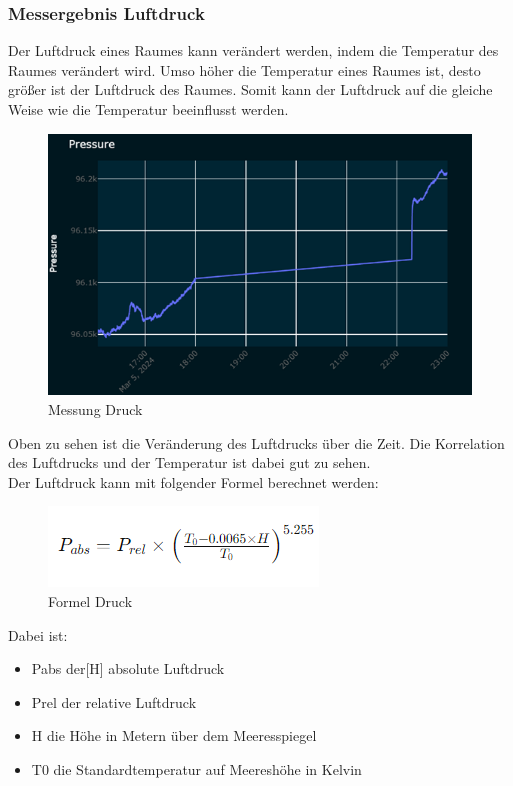 \subsubsection{Messergebnis Luftdruck}
Der Luftdruck eines Raumes kann verändert werden, indem die Temperatur des Raumes verändert wird. Umso höher die Temperatur eines Raumes ist, desto größer ist der Luftdruck des Raumes. Somit kann der Luftdruck auf die gleiche Weise wie die Temperatur beeinflusst werden.
\vspace{3mm}
\begin{figure}[H]
	\centering
	\includegraphics[scale=1]{image/druck.png}
	\caption{Messung Druck}
	\label{fig:enter-label}
\end{figure}
\vspace{3mm}
Oben zu sehen ist die Veränderung des Luftdrucks über die Zeit. Die Korrelation des Luftdrucks und der Temperatur ist dabei gut zu sehen. \\
\vspace{3mm}
Der Luftdruck kann mit folgender Formel berechnet werden: \\
\vspace{3mm}
\begin{figure}[H]
	\centering
	\includegraphics[scale=1.1]{image/formel.png}
	\caption{Formel Druck}
	\label{fig:enter-label}
\end{figure}
Dabei ist:
\begin{itemize}
	\item Pabs der[H] absolute Luftdruck
	\item Prel der relative Luftdruck
	\item H die Höhe in Metern über dem Meeresspiegel
	\item T0 die Standardtemperatur auf Meereshöhe in Kelvin
\end{itemize}
